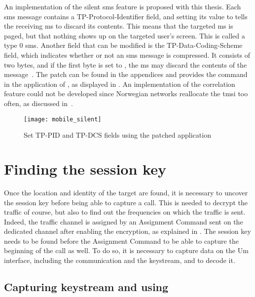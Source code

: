       An implementation of the silent \gls{sms} feature is proposed with
      this thesis. Each \gls{sms} message contains a
      TP-Protocol-Identifier field, and setting its value to 
      tells the receiving \gls{ms} to discard its contents. This means
      that the targeted \gls{ms} is paged, but that nothing shows up on
      the targeted user's screen. This is called a type 0 \gls{sms}.
      Another field that can be modified is the TP-Data-Coding-Scheme
      field, which indicates whether or not an \gls{sms} message is
      compressed. It consists of two bytes, and if the first byte is set
      to , the \gls{ms} may discard the contents of the
      message~\cite[p.~6]{etsi_gsm_1999}. The patch can be found in the
      appendices  and provides the 
      command in the  application of , as
      displayed in . An implementation of the
      correlation feature could not be developed since Norwegian
      networks reallocate the \gls{tmsi} too often, as discussed
      in~.

      \begin{figure}
        \centering
        \texttt{[image: mobile\_silent]}
        \caption{Set TP-PID and TP-DCS fields using the patched
         application}
        \label{fig:mobile_silent}
      \end{figure}
      
    \section{Finding the session key}
    \label{sec:finding_kc}

      Once the location and identity of the target are found, it is
      necessary to uncover the session key before being able to capture
      a call. This is needed to decrypt the traffic of course, but also
      to find out the frequencies on which the traffic is sent. Indeed,
      the traffic channel is assigned by an Assignment Command sent on
      the dedicated channel after enabling the encryption, as explained
      in . The session key needs to be found before
      the Assignment Command to be able to capture the beginning of the
      call as well. To do so, it is necessary to capture data on the Um
      interface, including the communication and the keystream, and to
      decode it.

      \subsection{Capturing keystream and using }
      \label{sec:keystream_and_kraken}

